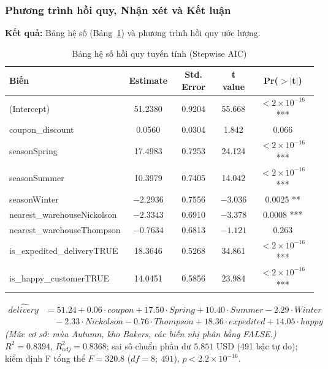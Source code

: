 \subsubsection{Phương trình hồi quy, Nhận xét và Kết luận}
\textbf{Kết quả:} Bảng hệ số (Bảng~\ref{tab:hq}) và phương trình hồi quy ước lượng.
\begin{table}[H]
    \centering
    \begin{tabular}{|l|c|c|c|c|}
    \hline
    \textbf{Biến} & \textbf{Estimate} & \textbf{Std. Error} & \textbf{t value} & \textbf{Pr($>|$\textbf{t}$|$)} \\ \hline
    (Intercept) & 51.2380 & 0.9204 & 55.668 & $< 2\times 10^{-16}$ *** \\ \hline
    coupon\_discount & 0.0560 & 0.0304 & 1.842 & 0.066 \\ \hline
    seasonSpring & 17.4983 & 0.7253 & 24.124 & $< 2\times 10^{-16}$ *** \\ \hline
    seasonSummer & 10.3979 & 0.7405 & 14.042 & $< 2\times 10^{-16}$ *** \\ \hline
    seasonWinter & $-2.2936$ & 0.7556 & $-3.036$ & 0.0025 ** \\ \hline
    nearest\_warehouseNickolson & $-2.3343$ & 0.6910 & $-3.378$ & 0.0008 *** \\ \hline
    nearest\_warehouseThompson & $-0.7634$ & 0.6813 & $-1.121$ & 0.263 \\ \hline
    is\_expedited\_deliveryTRUE & 18.3646 & 0.5268 & 34.861 & $< 2\times 10^{-16}$ *** \\ \hline
    is\_happy\_customerTRUE & 14.0451 & 0.5856 & 23.984 & $< 2\times 10^{-16}$ *** \\ \hline
    \end{tabular}
    \caption{Bảng hệ số hồi quy tuyến tính (Stepwise AIC)}
    \label{tab:hq}
\end{table}
\begin{align*}
\widehat{delivery} &= 51.24 + 0.06\cdot coupon + 17.50\cdot Spring + 10.40\cdot Summer - 2.29\cdot Winter \\
&\quad - 2.33\cdot Nickolson - 0.76\cdot Thompson + 18.36\cdot expedited + 14.05\cdot happy
\end{align*}
\textit{(Mức cơ sở: mùa Autumn, kho Bakers, các biến nhị phân bằng FALSE.)} $R^2 = 0.8394$, $R^2_{adj} = 0.8368$; sai số chuẩn phần dư $5.851$ USD (491 bậc tự do); kiểm định F tổng thể $F = 320.8$ ($df = 8;\ 491$), $p < 2.2 \times 10^{-16}$.

